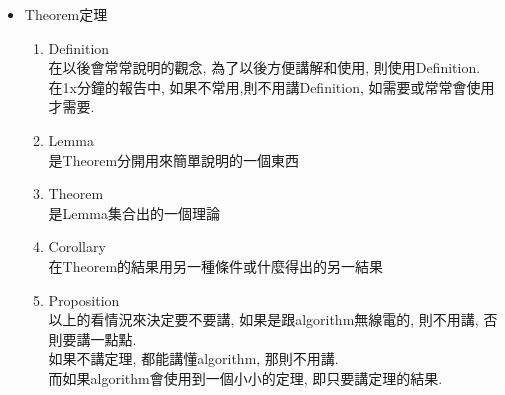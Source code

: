 \begin{enumerate}
{\begin{itemize}
{\begin{enumerate}
          \item
          {
            $ REL = A + B + C $\\
            只要講$REL$在算什麼就行了\\
            (除非別人不懂在講要算什麼, 才要把A, B, C都講出來大約算什麼則行了)
          } %
        \end{enumerate}
      } %

      \item
      {
        Theorem定理
        \begin{enumerate}
          \item
          {
            Definition\\
            在以後會常常說明的觀念, 為了以後方便講解和使用, 則使用Definition.\\
            在1x分鐘的報告中, 如果不常用,則不用講Definition, 如需要或常常會使用才需要.\\
          } %

          \item
          {
            Lemma\\
            是Theorem分開用來簡單說明的一個東西
          } %

          \item
          {
            Theorem\\
            是Lemma集合出的一個理論
          } %

          \item
          {
            Corollary\\
            在Theorem的結果用另一種條件或什麼得出的另一結果
          } %

          \item
          {
            Proposition\\
            以上的看情況來決定要不要講, 如果是跟algorithm無線電的, 則不用講, 否則要講一點點.\\

            如果不講定理, 都能講懂algorithm, 那則不用講.\\
            而如果algorithm會使用到一個小小的定理, 即只要講定理的結果.
          } %


\end{enumerate}}
\end{itemize}}
\end{enumerate}
